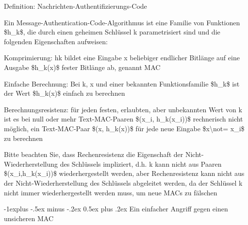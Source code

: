 \documentclass[a4paper]{article}
\makeatletter
\renewcommand{\subsection}{\@startsection{subsection}{2}{0mm}%
 {-1explus -.5ex minus -.2ex}%
 {0.5ex plus .2ex}%
 {\normalfont\normalsize\bfseries}}
\makeatother
\begin{document}
\begin{multicols}{3}
      \begin{itemize*}
            \item Definition: Nachrichten-Authentifizierungs-Code
            \begin{itemize*}
                  \item Ein Message-Authentication-Code-Algorithmus ist eine Familie von Funktionen \$h\_k\$, die durch einen geheimen Schlüssel k parametrisiert sind und die folgenden Eigenschaften aufweisen:
                  \begin{itemize*} \item Komprimierung: hk bildet eine Eingabe x beliebiger endlicher Bitlänge auf eine Ausgabe \$h\_k(x)\$ fester Bitlänge ab, genannt MAC \item Einfache Berechnung: Bei k, x und einer bekannten Funktionsfamilie \$h\_k\$ ist der Wert \$h\_k(x)\$ einfach zu berechnen \item Berechnungsresistenz: für jeden festen, erlaubten, aber unbekannten Wert von k ist es bei null oder mehr Text-MAC-Paaren \$(x\_i, h\_k(x\_i))\$ rechnerisch nicht möglich, ein Text-MAC-Paar \$(x, h\_k(x))\$ für jede neue Eingabe \$x\textbackslash not= x\_i\$ zu berechnen \end{itemize*}
                  \item Bitte beachten Sie, dass Rechenresistenz die Eigenschaft der Nicht-Wiederherstellung des Schlüssels impliziert, d.h. k kann nicht aus Paaren \$(x\_i,h\_k(x\_i))\$ wiederhergestellt werden, aber Rechenresistenz kann nicht aus der Nicht-Wiederherstellung des Schlüssels abgeleitet werden, da der Schlüssel k nicht immer wiederhergestellt werden muss, um neue MACs zu fälschen
            \end{itemize*}
      \end{itemize*}


      \subsection{Ein einfacher Angriff gegen einen unsicheren
            MAC}


\end{multicols}
\end{document}
